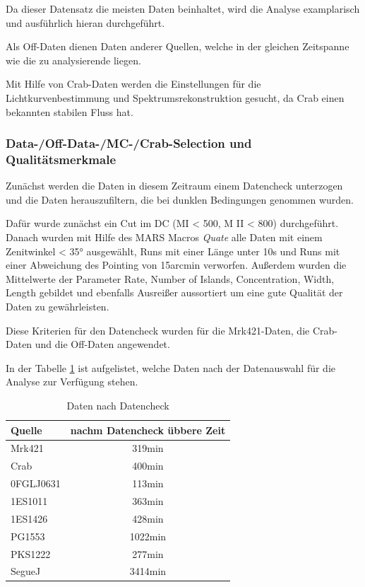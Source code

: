 Da dieser Datensatz die meisten Daten beinhaltet, wird die Analyse examplarisch und ausführlich hieran durchgeführt.

Als Off-Daten dienen Daten anderer Quellen, welche in der gleichen Zeitspanne wie die zu analysierende liegen.

Mit Hilfe von Crab-Daten werden die Einstellungen für die Lichtkurvenbestimmung und Spektrumsrekonstruktion gesucht, da Crab einen bekannten stabilen Fluss hat. 


\subsubsection{Data-/Off-Data-/MC-/Crab-Selection und Qualitätsmerkmale}
Zunächst werden die Daten in diesem Zeitraum einem Datencheck unterzogen und die Daten herauszufiltern, die bei dunklen Bedingungen genommen wurden. 

Dafür wurde zunächst ein Cut im DC (MI < 500, M II < 800) durchgeführt.
Danach wurden mit Hilfe des MARS Macros \textit{Quate} alle Daten mit einem Zenitwinkel < 35° ausgewählt, Runs mit einer Länge unter 10s und Runs mit einer Abweichung des Pointing von 15arcmin verworfen.
Außerdem wurden die Mittelwerte der Parameter Rate, Number of Islands, Concentration, Width, Length gebildet und ebenfalls Ausreißer aussortiert um eine gute Qualität der Daten zu gewährleisten.

Diese Kriterien für den Datencheck wurden für die Mrk421-Daten, die Crab-Daten und die Off-Daten angewendet.

In der Tabelle \ref{tab:Datenset2} ist aufgelistet, welche Daten nach der Datenauswahl für die Analyse zur Verfügung stehen.


\begin{table}[!h]
\centering
\caption{Daten nach Datencheck}
\label{tab:Datenset2}
\begin{tabular}{lc}
  \toprule
  Quelle & nachm Datencheck übbere Zeit\\
  \midrule
  \midrule
  Mrk421 & 319min\\
  \midrule
  Crab & 400min\\
  \midrule
  0FGLJ0631 & 113min \\
  1ES1011 & 363min \\
  1ES1426 & 428min \\
  PG1553 & 1022min \\
  PKS1222 & 277min \\
  SegueJ & 3414min \\
  \bottomrule
  \bottomrule
\end{tabular}
\end{table}


